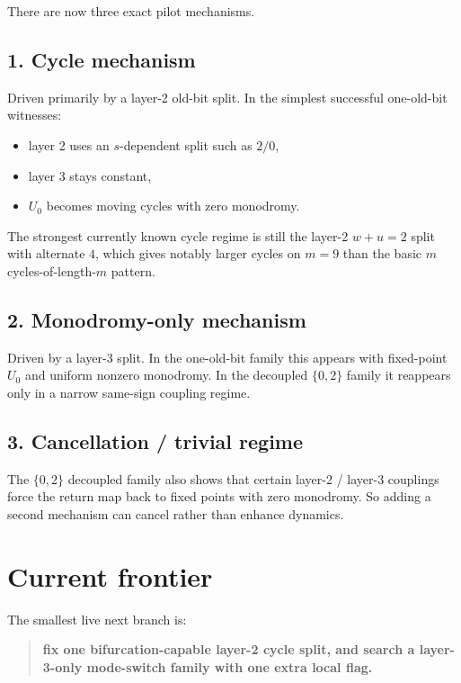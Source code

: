 \documentclass[11pt]{article}
\begin{document}
There are now three exact pilot mechanisms.

\subsection*{1. Cycle mechanism}

Driven primarily by a layer-2 old-bit split. In the simplest successful one-old-bit witnesses:
\begin{itemize}
    \item layer 2 uses an $s$-dependent split such as $2/0$,
    \item layer 3 stays constant,
    \item $U_0$ becomes moving cycles with zero monodromy.
\end{itemize}
The strongest currently known cycle regime is still the layer-2 $w+u=2$ split with alternate $4$, which gives notably larger cycles on $m=9$ than the basic $m$ cycles-of-length-$m$ pattern.

\subsection*{2. Monodromy-only mechanism}

Driven by a layer-3 split. In the one-old-bit family this appears with fixed-point $U_0$ and uniform nonzero monodromy. In the decoupled $\{0,2\}$ family it reappears only in a narrow same-sign coupling regime.

\subsection*{3. Cancellation / trivial regime}

The $\{0,2\}$ decoupled family also shows that certain layer-2 / layer-3 couplings force the return map back to fixed points with zero monodromy. So adding a second mechanism can cancel rather than enhance dynamics.

\section*{Current frontier}

The smallest live next branch is:

\begin{quote}
\textbf{fix one bifurcation-capable layer-2 cycle split, and search a layer-3-only mode-switch family with one extra local flag.}
\end{quote}
\end{document}
